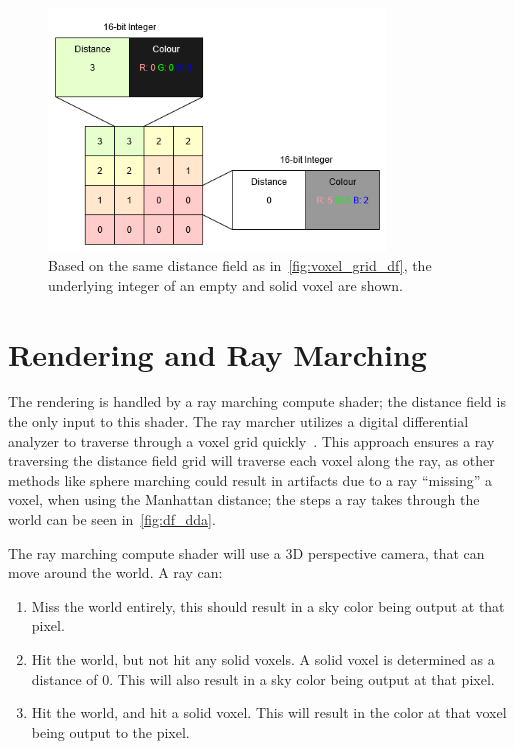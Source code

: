 \begin{figure}[htbp]
    \centering
    \includegraphics[width=0.8\textwidth]{figures/df_repr.drawio.png}
    \caption{Based on the same distance field as in~\ref{fig:voxel_grid_df}, the underlying integer of an empty and
        solid voxel are shown.}
    \label{fig:df_repr}
\end{figure}

\FloatBarrier

\section{Rendering and Ray Marching}\label{sec:ray_marching}
The rendering is handled by a ray marching compute shader; the distance field is the only input to this shader. The ray
marcher utilizes a digital differential analyzer to traverse through a voxel grid quickly~\cite{amanatides1987fast}.
This approach ensures a ray traversing the distance field grid will traverse each voxel along the ray, as other methods
like sphere marching could result in artifacts due to a ray ``missing'' a voxel, when using the Manhattan distance; the
steps a ray takes through the world can be seen in~\ref{fig:df_dda}.

The ray marching compute shader will use a 3D perspective camera, that can move around the world. A ray can:

\begin{enumerate}
    \item Miss the world entirely, this should result in a sky color being output at that pixel.
    \item Hit the world, but not hit any solid voxels. A solid voxel is determined as a distance of 0. This will also
          result in a sky color being output at that pixel.
    \item Hit the world, and hit a solid voxel. This will result in the color at that voxel being output to the pixel.
\end{enumerate}

